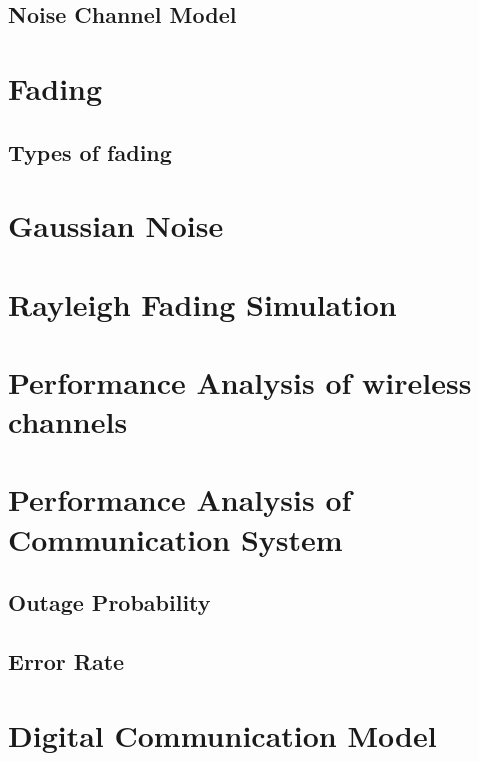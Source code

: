 \documentclass{beamer}
\begin{document}
\subsection{Noise Channel Model}
\section{Fading}
\subsection{Types of fading}
\section{Gaussian Noise}
\section{Rayleigh Fading Simulation}
\section{Performance Analysis of wireless channels}
\section{Performance Analysis of Communication System}
\subsection{Outage Probability}
\subsection{Error Rate}
\section{Digital Communication Model}
\end{document}
